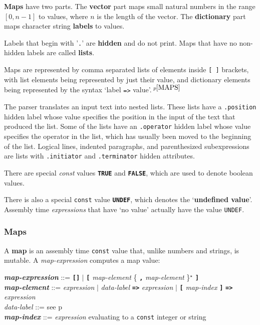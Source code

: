 \documentclass[12pt]{article}
\newcommand{\TT}[1]{{\tt \bfseries #1}}
\newcommand{\STAR}{{\Large $^\star$}}
\newcommand{\key}[1]{{\rm \bfseries #1}}
\newcommand{\ttkey}[1]{{\tt \bfseries #1}}
\newcommand{\emkey}[1]{{\em \bfseries #1}}
\newcommand{\pagref}[1]{p\pageref{#1}}
\newcommand{\pagnote}[1]{$\,^{p\pageref{#1}}$}
\newenvironment{indpar}[1][0.3in]%
	{\begin{list}{}%
		     {\setlength{\itemsep}{0in}%
		      \setlength{\topsep}{0in}%
		      \setlength{\parsep}{1ex}%
		      \setlength{\labelwidth}{#1}%
		      \setlength{\leftmargin}{#1}%
		      \addtolength{\leftmargin}{\labelsep}}%
	 \item}%
	{\end{list}}
\begin{document}
\key{Maps} have two parts.  The \key{vector} part maps small
natural numbers in the range $[0,n-1]$ to values, where $n$
is the length of the vector.  The \key{dictionary} part maps
character string \key{labels} to values.

Labels that begin with '{\tt .}' are \key{hidden} and do not
print.  Maps that have no non-hidden labels are called \key{lists}.

Maps are represented by comma separated lists of elements inside
{\tt [~]} brackets, with list elements being represented by
just their value, and dictionary elements being represented
by the syntax `label {\tt =>} value'.\pagnote{MAPS}

The parser translates an input text into nested lists.  These
lists have a {\tt .position} hidden label whose value specifies
the position in the input of the text that produced the list.
Some of the lists have an {\tt .operator} hidden label whose
value specifies the operator in the list, which has usually
been moved to the beginning of the list.  Logical lines,
indented paragraphs, and parenthesized subexpressions
are lists with {\tt .initiator} and {\tt .terminator}
hidden attributes.

There are special {\em const} values \ttkey{TRUE} and
\ttkey{FALSE}, which are used to denote boolean values.

There is also a special {\tt const} value \ttkey{UNDEF},
which denotes the `\key{undefined value}'.  Assembly time
{\em expressions} that have `no value' actually have the
value {\tt UNDEF}.

\subsubsection{Maps}
\label{MAPS}

A \key{map} is an assembly time {\tt const} value that, unlike
numbers and strings, is mutable.
A {\em map-expression} computes a map value:

\begin{indpar}
\emkey{map-expression} ::=
    \TT{[]} $|$
    \TT{[} {\em map-element} \{ \TT{,} {\em map-element} \}\STAR{} \TT{]}
\\[0.5ex]
\emkey{map-element} ::=
        {\em expression} $|$ {\em data-label} \TT{=>} {\em expression}
	                 $|$ \TT{[} {\em map-index} \TT{]}
			 	\TT{=>} {\em expression}
\\[0.5ex]
{\em data-label} ::= see \pagref{DATA-LABEL}
\\[0.5ex]
\emkey{map-index} ::=
    {\em expression} evaluating to a {\tt const} integer or string
\end{indpar}
\end{document}
